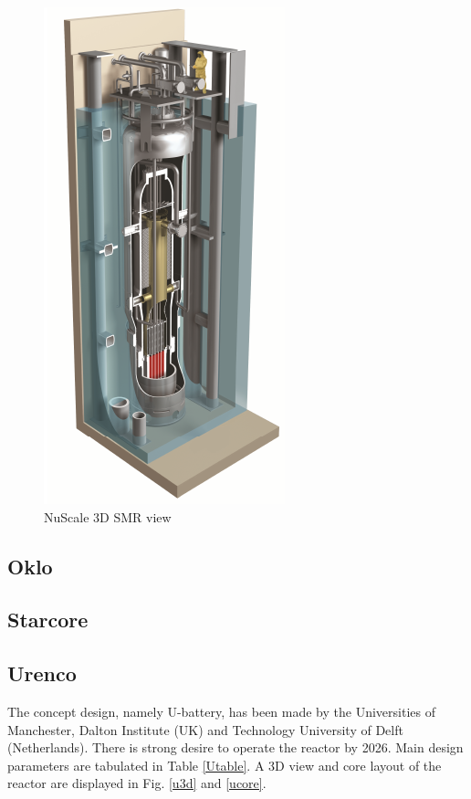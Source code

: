 \documentclass[10pt,a4paper]{article}
\begin{document}
\begin{figure}[htbp]
\centering
\includegraphics[scale=0.8]{Figs/fig3.jpeg}
\caption{NuScale 3D SMR view}
\label{Nu3d}
\end{figure}

\subsection{Oklo}

\subsection{Starcore}

\subsection{Urenco}
The concept design, namely U-battery, has been made by the Universities of Manchester, Dalton Institute (UK) and Technology University of Delft (Netherlands). There is strong desire to operate the reactor by 2026. Main design parameters \cite{Ubattery} are tabulated in Table \ref{Utable}. A 3D view and core layout of the reactor are displayed in Fig. \ref{u3d} and \ref{ucore}. 
\end{document}
